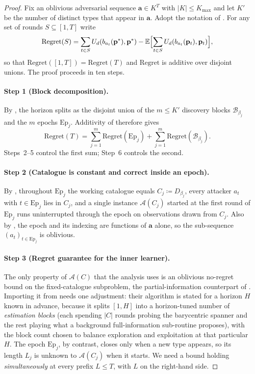 \documentclass[letterpaper,9pt,twocolumn]{extarticle}
\newcommand{\pvec}{\mathbf{p}}
\newcommand{\avec}{\mathbf{a}}
\newcommand{\EE}{\mathbb{E}}
\newcommand{\Kmax}{K_{\max}}
\newcommand{\cB}{\mathcal{B}}
\newcommand{\Ep}{\mathrm{Ep}}
\newcommand{\Regret}{\mathrm{Regret}}
\theoremstyle{plain}
\theoremstyle{definition}
\theoremstyle{remark}
\begin{document}
\begin{proof}
Fix an oblivious adversarial sequence $\avec\in K^T$ with $|K|\le\Kmax$
and let $K'$ be the number of distinct types that appear in $\avec$.
Adopt the notation of . For any set of rounds
$S\subseteq[1,T]$ write
\begin{equation}
\Regret(S)=\sum_{t\in S}U_d(b_{a_t}(\pvec^{*}),\pvec^{*})
-\EE\Bigl[\sum_{t\in S}U_d(b_{a_t}(\pvec_t),\pvec_t)\Bigr],
\label{eq:regret-of-S}
\end{equation}
so that $\Regret([1,T])=\Regret(T)$ and $\Regret$ is additive over
disjoint unions. The proof proceeds in ten steps.

\paragraph{Step 1 (Block decomposition).}
By , the horizon splits as the disjoint union of the
$m\le K'$ discovery blocks $\cB_{\beta_j}$ and the $m$ epochs $\Ep_j$.
Additivity of  therefore gives
\begin{equation}
\Regret(T)=\sum_{j=1}^{m}\Regret(\Ep_j)+\sum_{j=1}^{m}\Regret(\cB_{\beta_j}).
\label{eq:block-split}
\end{equation}
Steps~2--5 control the first sum; Step~6 controls the second.

\paragraph{Step 2 (Catalogue is constant and correct inside an epoch).}
By , throughout $\Ep_j$ the working catalogue equals
$C_j\coloneqq D_{\beta_j}$, every attacker $a_t$ with $t\in\Ep_j$ lies in
$C_j$, and a single instance $\mathcal{A}(C_j)$ started at the first
round of $\Ep_j$ runs uninterrupted through the epoch on observations
drawn from $C_j$. Also by , the epoch and its indexing
are functions of $\avec$ alone, so the sub-sequence
$(a_t)_{t\in\Ep_j}$ is oblivious.

\paragraph{Step 3 (Regret guarantee for the inner learner).}
The only property of $\mathcal{A}(C)$ that the analysis uses is an
oblivious no-regret bound on the fixed-catalogue subproblem, the
partial-information counterpart of . Importing it from
\citet[Theorem 6.1]{balcan2015} needs one adjustment: their algorithm is
stated for a horizon $H$ known in advance, because it splits $[1,H]$
into a horizon-tuned number of \emph{estimation blocks} (each spending
$|C|$ rounds probing the barycentric spanner and the rest playing what a
background full-information sub-routine proposes), with the block count
chosen to balance exploration and exploitation at that particular $H$.
The epoch $\Ep_j$, by contrast, closes only when a new type appears,
so its length $L_j$ is unknown to $\mathcal{A}(C_j)$ when it starts.
We need a bound holding \emph{simultaneously} at every prefix
$L\le T$, with $L$ on the right-hand side.


\end{proof}
\end{document}
